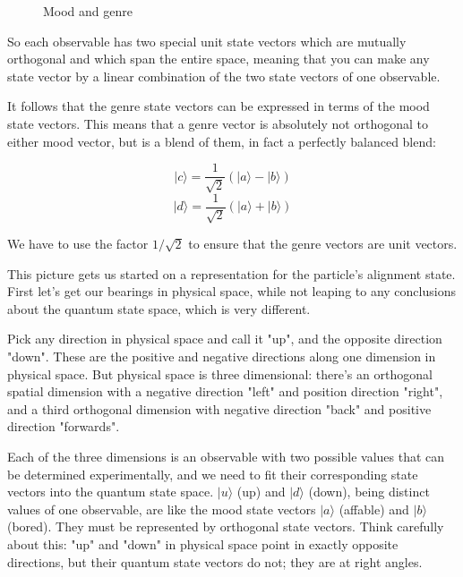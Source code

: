 \begin{figure}[h]
  \centering
  \centering
  \caption{Mood and genre} \label{fig:mood-and-genre-recap}
\end{figure}

So each observable has two special unit state vectors which are mutually orthogonal and which span the entire space, meaning that you can make any state vector by a linear combination of the two state vectors of one observable.

It follows that the genre state vectors can be expressed in terms of the mood state vectors. This means that a genre vector is absolutely not orthogonal to either mood vector, but is a blend of them, in fact a perfectly balanced blend:

$$
|c\rangle = \frac{1}{\sqrt{2}}(|a\rangle - |b\rangle)
$$
$$
|d\rangle = \frac{1}{\sqrt{2}}(|a\rangle + |b\rangle)
$$

We have to use the factor $1/\sqrt{2}$ to ensure that the genre vectors are unit vectors.

This picture gets us started on a representation for the particle's alignment state. First let's get our bearings in physical space, while not leaping to any conclusions about the quantum state space, which is very different.

Pick any direction in physical space and call it "up", and the opposite direction "down". These are the positive and negative directions along one dimension in physical space. But physical space is three dimensional: there's an orthogonal spatial dimension with a negative direction "left" and position direction "right", and a third orthogonal dimension with negative direction "back" and positive direction "forwards".

Each of the three dimensions is an observable with two possible values that can be determined experimentally, and we need to fit their corresponding state vectors into the quantum state space. $|u\rangle$ (up) and $|d\rangle$ (down), being distinct values of one observable, are like the mood state vectors $|a\rangle$ (affable) and $|b\rangle$ (bored). They must be represented by orthogonal state vectors. Think carefully about this: "up" and "down" in physical space point in exactly opposite directions, but their quantum state vectors do not; they are at right angles.

